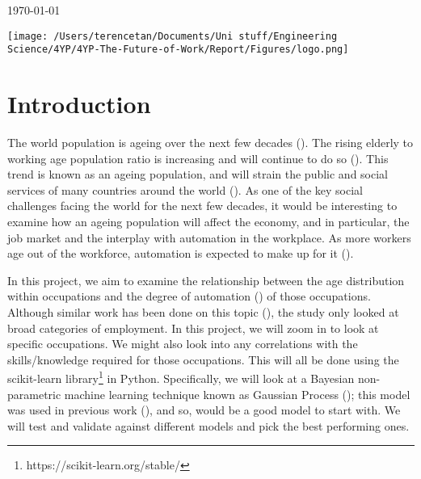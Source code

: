 \documentclass[11pt]{article}
\begin{document}
\begin{titlepage}
	
	\vfill\vfill\vfill %
	
	{\large\today} %
	
	
	\vfill\vfill
	\texttt{[image: /Users/terencetan/Documents/Uni stuff/Engineering Science/4YP/4YP-The-Future-of-Work/Report/Figures/logo.png]}\\[1cm] %
	 
	
	\vfill %
	
\end{titlepage}



\section{Introduction}
\label{sec:Introduction}
The world population is ageing over the next few decades (\cite{science}). The rising elderly to working age population ratio is increasing and will continue to do so (\cite{WHO}). This trend is known as an ageing population, and will strain the public and social services of many countries around the world (\cite{publicservicesstrain}). As one of the key social challenges facing the world for the next few decades, it would be interesting to examine how an ageing population will affect the economy, and in particular, the job market and the interplay with automation in the workplace. As more workers age out of the workforce, automation is expected to make up for it (\cite{futureofemployment}).

In this project, we aim to examine the relationship between the age distribution within occupations and the degree of automation (\cite{futureofemployment}) of those occupations. Although similar work has been done on this topic (\cite{twinthreats}), the study only looked at broad categories of employment. In this project, we will zoom in to look at specific occupations. We might also look into any correlations with the skills/knowledge required for those occupations. This will all be done using the scikit-learn library\footnote{https://scikit-learn.org/stable/} in Python. Specifically, we will look at a Bayesian non-parametric machine learning technique known as Gaussian Process (\cite{GaussianProcess}); this model was used in previous work (\cite{futureofemployment}), and so, would be a good model to start with. We will test and validate against different models and pick the best performing ones.
\end{document}
